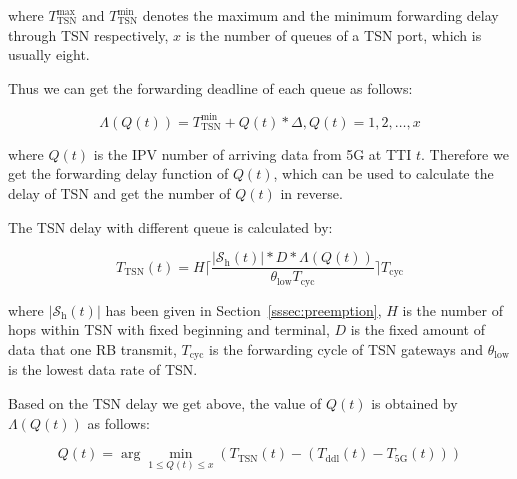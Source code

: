 \documentclass{SCIS2021}
\begin{document}
	\vspace{-6pt}
	\noindent where $T_{\text{TSN}}^{\text{max}}$ and $T_{\text{TSN}}^{\text{min}}$ denotes the maximum and the minimum forwarding delay through TSN respectively, $x$ is the number of queues of a TSN port, which is usually eight.

	\par Thus we can get the forwarding deadline of each queue as follows:

	\setlength\abovedisplayskip{-16pt}
	\begin{center}
		\begin{equation}
			\Lambda\left(Q(t)\right)=T_{\text{TSN}}^{\text{min}}+Q(t) * \Delta,  Q(t)=1,2, \ldots, x
		\end{equation}
	\end{center}
	\setlength\belowdisplayskip{-8pt}

	\vspace{-6pt}
	\noindent where $Q(t)$ is the IPV number of arriving data from 5G at TTI $t$. Therefore we get the forwarding delay function of $Q(t)$, which can be used to calculate the delay of TSN and get the number of $Q(t)$ in reverse.

	\par  The TSN delay with different queue is calculated by:

	\setlength\abovedisplayskip{-16pt}
	\begin{center}
		\begin{equation}
			T_\text{TSN}(t)=H\bigg\lceil\frac{\left|\mathcal{S}_{\mathrm{h}}(t)\right| * D * \Lambda\left(Q(t)\right)}{\theta_\text{low} T_{\text{cyc}}}\bigg\rceil T_{\mathrm{cyc}}
		\end{equation}
	\end{center}
	\setlength\belowdisplayskip{-8pt}

	\vspace{-6pt}
	\noindent where $\left|\mathcal{S}_{\mathrm{h}}(t)\right|$ has been given in Section~\ref{sssec:preemption}, $H$ is the number of hops within TSN with fixed beginning and terminal, $D$ is the fixed amount of data that one RB transmit, $T_{\mathrm{cyc}}$ is the forwarding cycle of TSN gateways and $\theta_\text{low}$ is the lowest data rate of TSN.

	\par Based on the TSN delay we get above, the value of $Q(t)$ is obtained by $\Lambda\left(Q(t)\right)$ as follows:

	\setlength\abovedisplayskip{-16pt}
	\begin{center}
		\begin{equation}
			Q(t)=\arg \min _{1 \leq Q(t) \leq x}\left(T_\text{TSN}(t)-\left(T_\text{ddl}(t)-T_\text{5G}(t)\right)\right)
		\end{equation}
	\end{center}
	\setlength\belowdisplayskip{-8pt}
\end{document}
